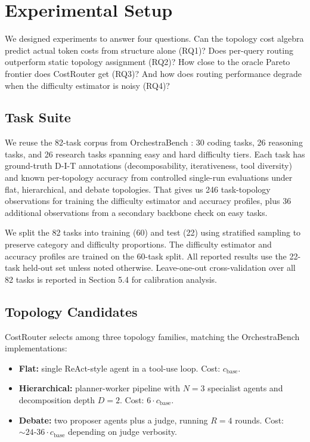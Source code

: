 \section{Experimental Setup}\label{experimental-setup}

We designed experiments to answer four questions. Can the topology cost algebra predict actual token costs from structure alone (RQ1)? Does per-query routing outperform static topology assignment (RQ2)? How close to the oracle Pareto frontier does CostRouter get (RQ3)? And how does routing performance degrade when the difficulty estimator is noisy (RQ4)?

\subsection{Task Suite}\label{task-suite}

We reuse the 82-task corpus from OrchestraBench \cite{orchestrabench_2026}: 30 coding tasks, 26 reasoning tasks, and 26 research tasks spanning easy and hard difficulty tiers. Each task has ground-truth D-I-T annotations (decomposability, iterativeness, tool diversity) and known per-topology accuracy from controlled single-run evaluations under flat, hierarchical, and debate topologies. That gives us 246 task-topology observations for training the difficulty estimator and accuracy profiles, plus 36 additional observations from a secondary backbone check on easy tasks.

We split the 82 tasks into training (60) and test (22) using stratified sampling to preserve category and difficulty proportions. The difficulty estimator and accuracy profiles are trained on the 60-task split. All reported results use the 22-task held-out set unless noted otherwise. Leave-one-out cross-validation over all 82 tasks is reported in Section 5.4 for calibration analysis.

\subsection{Topology Candidates}\label{topology-candidates}

CostRouter selects among three topology families, matching the OrchestraBench implementations:

\begin{itemize}
\tightlist
\item
  \textbf{Flat:} single ReAct-style agent in a tool-use loop. Cost: $c_{\text{base}}$.
\item
  \textbf{Hierarchical:} planner-worker pipeline with $N = 3$ specialist agents and decomposition depth $D = 2$. Cost: $6 \cdot c_{\text{base}}$.
\item
  \textbf{Debate:} two proposer agents plus a judge, running $R = 4$ rounds. Cost: $\sim 24\text{-}36 \cdot c_{\text{base}}$ depending on judge verbosity.
\end{itemize}

